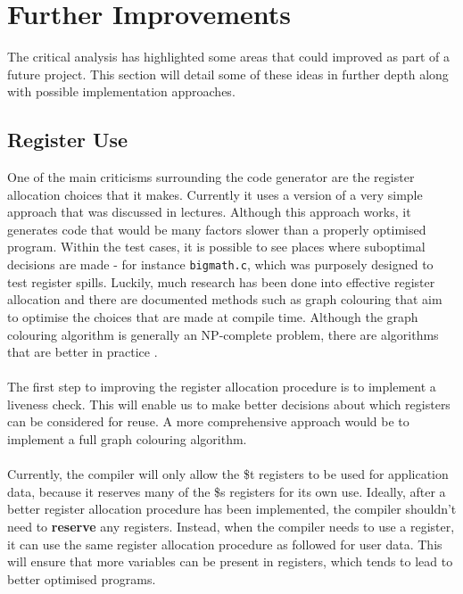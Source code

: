 \chapter{Further Improvements}

The critical analysis has highlighted some areas that could improved as part of a future project. This section will detail some of these ideas in further depth along with possible implementation approaches.

\section{Register Use}
One of the main criticisms surrounding the code generator are the register allocation choices that it makes. Currently it uses a version of a very simple approach that was discussed in lectures. Although this approach works, it generates code that would be many factors slower than a properly optimised program. Within the test cases, it is possible to see places where suboptimal decisions are made - for instance \verb!bigmath.c!, which was purposely designed to test register spills. Luckily, much research has been done into effective register allocation and there are documented methods such as graph colouring that aim to optimise the choices that are made at compile time. Although the graph colouring algorithm is generally an NP-complete problem, there are algorithms that are better in practice \cite{aho2007}.
\ \\ \ \\
The first step to improving the register allocation procedure is to implement a liveness check. This will enable us to make better decisions about which registers can be considered for reuse. A more comprehensive approach would be to implement a full graph colouring algorithm.
\ \\ \ \\
Currently, the compiler will only allow the \$t registers to be used for application data, because it reserves many of the \$s registers for its own use. Ideally, after a better register allocation procedure has been implemented, the compiler shouldn't need to \textbf{reserve} any registers. Instead, when the compiler needs to use a register, it can use the same register allocation procedure as followed for user data. This will ensure that more variables can be present in registers, which tends to lead to better optimised programs.
